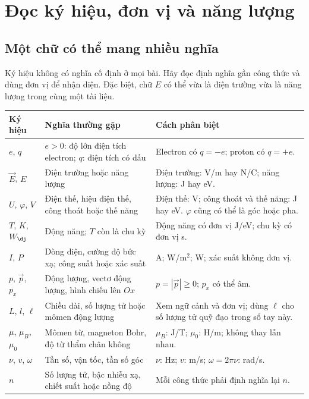 \documentclass[11pt,a4paper]{article}
\newcommand{\chap}[1]{\par\section{#1}}
\begin{document}
\chap{Đọc ký hiệu, đơn vị và năng lượng}
\subsection{Một chữ có thể mang nhiều nghĩa}\label{sec:symbol}
Ký hiệu không có nghĩa cố định ở mọi bài. Hãy đọc định nghĩa gần công thức
và dùng đơn vị để nhận diện. Đặc biệt, chữ $E$ có thể vừa là điện trường
vừa là năng lượng trong cùng một tài liệu.

\begin{tabularx}{\textwidth}{@{}Q{2.5cm}Q{4.1cm}Y@{}}
\toprule
\textbf{Ký hiệu} & \textbf{Nghĩa thường gặp} & \textbf{Cách phân biệt}\\\midrule
$e$, $q$ & $e>0$: độ lớn điện tích electron; $q$: điện tích có dấu & Electron có $q=-e$; proton có $q=+e$.\\
$\vec E$, $E$ & Điện trường hoặc năng lượng & Điện trường: V/m hay N/C; năng lượng: J hay eV.\\
$U$, $\varphi$, $V$ & Điện thế, hiệu điện thế, công thoát hoặc thế năng & Điện thế: V; công thoát và thế năng: J hay eV. $\varphi$ cũng có thể là góc hoặc pha.\\
$T$, $K$, $W_{\rm đ}$ & Động năng; $T$ còn là chu kỳ & Động năng có đơn vị J/eV; chu kỳ có đơn vị s.\\
$I$, $P$ & Dòng điện, cường độ bức xạ; công suất hoặc xác suất & A; W/m$^2$; W; xác suất không đơn vị.\\
$p$, $\vec p$, $p_x$ & Động lượng, vectơ động lượng, hình chiếu lên $Ox$ & $p=|\vec p|\ge0$; $p_x$ có thể âm.\\
$L$, $l$, $\ell$ & Chiều dài, số lượng tử hoặc mômen động lượng & Xem ngữ cảnh và đơn vị; dùng $\ell$ cho số lượng tử quỹ đạo trong sổ tay này.\\
$\mu$, $\mu_B$, $\mu_0$ & Mômen từ, magneton Bohr, độ từ thẩm chân không & $\mu_B$: J/T; $\mu_0$: H/m; không thay lẫn nhau.\\
$\nu$, $v$, $\omega$ & Tần số, vận tốc, tần số góc & $\nu$: Hz; $v$: m/s; $\omega=2\pi\nu$: rad/s.\\
$n$ & Số lượng tử, bậc nhiễu xạ, chiết suất hoặc nồng độ & Mỗi công thức phải định nghĩa lại $n$.\\
\bottomrule
\end{tabularx}
\end{document}
